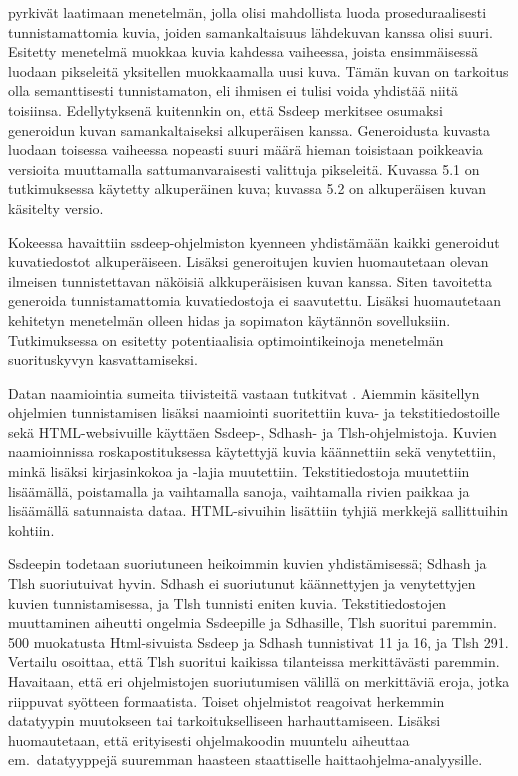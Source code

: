 \textcite{ermerins} pyrkivät laatimaan menetelmän, jolla olisi mahdollista luoda proseduraalisesti tunnistamattomia kuvia, joiden samankaltaisuus lähdekuvan kanssa olisi suuri. Esitetty menetelmä muokkaa kuvia kahdessa vaiheessa, joista ensimmäisessä luodaan pikseleitä yksitellen muokkaamalla uusi kuva. Tämän kuvan on tarkoitus olla
semanttisesti tunnistamaton, eli ihmisen ei tulisi voida yhdistää niitä
toisiinsa. Edellytyksenä kuitennkin on, että Ssdeep merkitsee osumaksi generoidun kuvan samankaltaiseksi alkuperäisen kanssa. Generoidusta kuvasta luodaan
toisessa vaiheessa nopeasti suuri määrä hieman toisistaan poikkeavia
versioita muuttamalla sattumanvaraisesti valittuja pikseleitä.
Kuvassa 5.1 on tutkimuksessa käytetty alkuperäinen kuva; kuvassa 5.2
on alkuperäisen kuvan käsitelty versio.

Kokeessa havaittiin ssdeep-ohjelmiston kyenneen yhdistämään kaikki generoidut kuvatiedostot alkuperäiseen. Lisäksi generoitujen kuvien huomautetaan olevan ilmeisen
tunnistettavan näköisiä alkkuperäisisen kuvan kanssa. Siten tavoitetta generoida tunnistamattomia kuvatiedostoja ei saavutettu. Lisäksi huomautetaan kehitetyn menetelmän olleen hidas ja sopimaton käytännön sovelluksiin. Tutkimuksessa on esitetty
potentiaalisia optimointikeinoja menetelmän suorituskyvyn kasvattamiseksi.

Datan naamiointia sumeita tiivisteitä vastaan tutkitvat \textcite{oliver14}.
Aiemmin käsitellyn ohjelmien tunnistamisen lisäksi naamiointi suoritettiin
kuva- ja tekstitiedostoille sekä HTML-websivuille käyttäen Ssdeep-, Sdhash-
ja Tlsh-ohjelmistoja. Kuvien naamioinnissa roskapostituksessa
käytettyjä kuvia käännettiin sekä venytettiin, minkä lisäksi
kirjasinkokoa ja -lajia muutettiin. Tekstitiedostoja muutettiin
lisäämällä, poistamalla ja vaihtamalla sanoja, vaihtamalla
rivien paikkaa ja lisäämällä satunnaista dataa. HTML-sivuihin
lisättiin tyhjiä merkkejä sallittuihin kohtiin.

Ssdeepin todetaan suoriutuneen heikoimmin kuvien yhdistämisessä;
Sdhash ja Tlsh suoriutuivat hyvin. Sdhash ei suoriutunut käännettyjen
ja venytettyjen kuvien tunnistamisessa, ja Tlsh tunnisti eniten kuvia.
Tekstitiedostojen muuttaminen aiheutti ongelmia Ssdeepille ja Sdhasille,
Tlsh suoritui paremmin. 500 muokatusta Html-sivuista Ssdeep ja Sdhash
tunnistivat 11 ja 16, ja Tlsh 291. Vertailu osoittaa, että Tlsh suoritui
kaikissa tilanteissa merkittävästi paremmin. Havaitaan, että eri ohjelmistojen
suoriutumisen välillä on merkittäviä eroja, jotka riippuvat syötteen
formaatista. Toiset ohjelmistot reagoivat herkemmin datatyypin
muutokseen tai tarkoitukselliseen harhauttamiseen. Lisäksi
huomautetaan, että erityisesti ohjelmakoodin muuntelu aiheuttaa
em.\ datatyyppejä suuremman haasteen staattiselle
haittaohjelma-analyysille.

